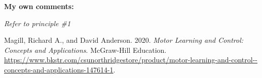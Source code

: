 \documentclass[
  letterpaper,
  DIV=11,
  numbers=noendperiod]{scrartcl}
\newlength{\cslhangindent}
\newlength{\cslentryspacingunit} %
\newenvironment{CSLReferences}[2] %
 {%
  \setlength{\parindent}{0pt}
  \ifodd #1
  \let\oldpar\par
  \def\par{\hangindent=\cslhangindent\oldpar}
  \fi
  \setlength{\parskip}{#2\cslentryspacingunit}
 }%
 {}
\begin{document}
\textbf{My own comments:}

\emph{Refer to principle \#1}

\hypertarget{refs}{}
\begin{CSLReferences}{1}{0}
\leavevmode{}%
Magill, Richard A., and David Anderson. 2020. \emph{Motor Learning and
Control: Concepts and Applications}. McGraw-Hill Education.
\url{https://www.bkstr.com/csunorthridgestore/product/motor-learning-and-control--concepts-and-applications-147614-1}.

\end{CSLReferences}
\end{document}
